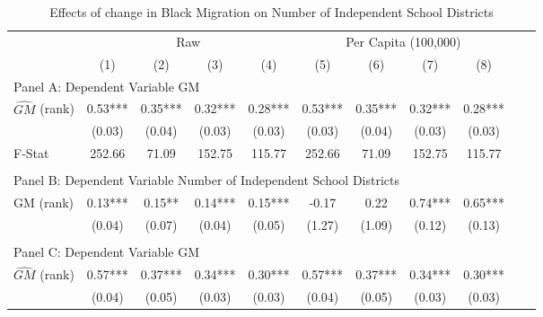  \begin{table}[htbp]\centering {} \begin{threeparttable} \caption{Effects of change in Black Migration on Number of Independent School Districts} \begin{tabular}{l*{10}{c}} \toprule
                &\multicolumn{4}{c}{Raw}                                    &\multicolumn{4}{c}{Per Capita (100,000)}                   \\\cmidrule(lr){2-5}\cmidrule(lr){6-9}
                &\multicolumn{1}{c}{(1)}   &\multicolumn{1}{c}{(2)}   &\multicolumn{1}{c}{(3)}   &\multicolumn{1}{c}{(4)}   &\multicolumn{1}{c}{(5)}   &\multicolumn{1}{c}{(6)}   &\multicolumn{1}{c}{(7)}   &\multicolumn{1}{c}{(8)}   \\
\cmidrule(lr){1-9}
\multicolumn{8}{l}{Panel A: Dependent Variable GM}\\
\cmidrule(lr){1-9}
$\hat{GM}$ (rank)&       0.53***&       0.35***&       0.32***&       0.28***&       0.53***&       0.35***&       0.32***&       0.28***\\
                &     (0.03)   &     (0.04)   &     (0.03)   &     (0.03)   &     (0.03)   &     (0.04)   &     (0.03)   &     (0.03)   \\
\midrule
F-Stat          &     252.66   &      71.09   &     152.75   &     115.77   &     252.66   &      71.09   &     152.75   &     115.77   \\
\cmidrule[\heavyrulewidth](lr){1-9} \\ \cmidrule[\heavyrulewidth](lr){1-9}
\multicolumn{8}{l}{Panel B: Dependent Variable Number of Independent School Districts}\\
\cmidrule(lr){1-9}
GM  (rank)      &       0.13***&       0.15** &       0.14***&       0.15***&      -0.17   &       0.22   &       0.74***&       0.65***\\
                &     (0.04)   &     (0.07)   &     (0.04)   &     (0.05)   &     (1.27)   &     (1.09)   &     (0.12)   &     (0.13)   \\
\cmidrule[\heavyrulewidth](lr){1-9} \\ \cmidrule[\heavyrulewidth](lr){1-9}
\multicolumn{8}{l}{Panel C: Dependent Variable GM}\\
\cmidrule(lr){1-9}
$\hat{GM}$ (rank)&       0.57***&       0.37***&       0.34***&       0.30***&       0.57***&       0.37***&       0.34***&       0.30***\\
                &     (0.04)   &     (0.05)   &     (0.03)   &     (0.03)   &     (0.04)   &     (0.05)   &     (0.03)   &     (0.03)   \\

\end{tabular}
\end{threeparttable}
\end{table}
